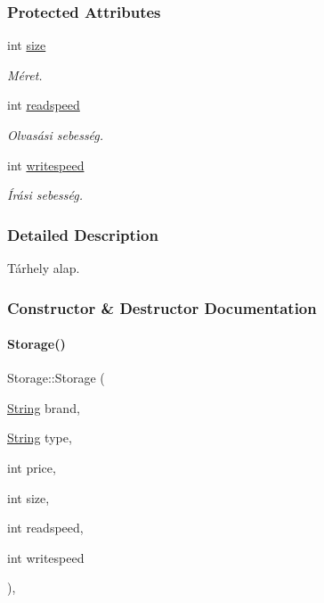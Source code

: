 \subsubsection*{Protected Attributes}
\begin{DoxyCompactItemize}
\item 
int \mbox{\hyperlink{class_storage_abcc80ce58a21fa884035617ee0b6cb67}{size}}
\begin{DoxyCompactList}\small\item\em Méret. \end{DoxyCompactList}\item 
int \mbox{\hyperlink{class_storage_a41073842ff16961dad3903e6dd49bb0c}{readspeed}}
\begin{DoxyCompactList}\small\item\em Olvasási sebesség. \end{DoxyCompactList}\item 
int \mbox{\hyperlink{class_storage_a0198a1483ccf849d48c76da88599ba8b}{writespeed}}
\begin{DoxyCompactList}\small\item\em Írási sebesség. \end{DoxyCompactList}\end{DoxyCompactItemize}


\subsubsection{Detailed Description}
Tárhely alap. 

\subsubsection{Constructor \& Destructor Documentation}
\mbox{\label{class_storage_a502a2ec76e09d48a87da6ed1b91cdaa8}} 
\paragraph{\texorpdfstring{Storage()}{Storage()}}
{\footnotesize\ttfamily Storage\+::\+Storage (\begin{DoxyParamCaption}\item[{\mbox{\hyperlink{class_string}{String}}}]{brand,  }\item[{\mbox{\hyperlink{class_string}{String}}}]{type,  }\item[{int}]{price,  }\item[{int}]{size,  }\item[{int}]{readspeed,  }\item[{int}]{writespeed }\end{DoxyParamCaption})\hspace{0.3cm}{\ttfamily [inline]}, {\ttfamily [explicit]}}



